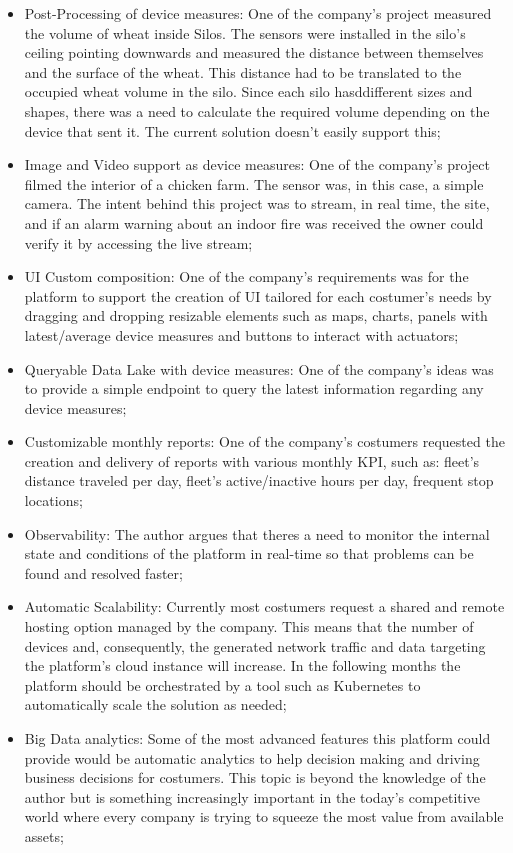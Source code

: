 \begin{itemize}
    \item Post-Processing of device measures: One of the company's project measured the volume of wheat inside Silos. The sensors were installed in the silo's ceiling pointing downwards and measured the distance between themselves and the surface of the wheat. This distance had to be translated to the occupied wheat volume in the silo. Since each silo hasddifferent sizes and shapes, there was a need to calculate the required volume depending on the device that sent it. The current solution doesn't easily support this;
    \item Image and Video support as device measures: One of the company's project filmed the interior of a chicken farm. The sensor was, in this case, a simple camera. The intent behind this project was to stream, in real time, the site, and if an alarm warning about an indoor fire was received the owner could verify it by accessing the live stream;
    \item UI Custom composition: One of the company's requirements was for the platform to support the creation of \gls{UI} tailored for each costumer's needs by dragging and dropping resizable elements such as maps, charts, panels with latest/average device measures and buttons to interact with actuators;
    \item Queryable Data Lake with device measures: One of the company's ideas was to provide a simple endpoint to query the latest information regarding any device measures;
    \item Customizable monthly reports: One of the company's costumers requested the creation and delivery of reports with various monthly \gls{KPI}, such as: fleet's distance traveled per day, fleet's active/inactive hours per day, frequent stop locations;
    \item Observability: The author argues that theres a need to monitor the internal state and conditions of the platform in real-time so that problems can be found and resolved faster;
    \item Automatic Scalability: Currently most costumers request a shared and remote hosting option managed by the company. This means that the number of devices and, consequently, the generated network traffic and data targeting the platform's cloud instance will increase. In the following months the platform should be orchestrated by a tool such as Kubernetes to automatically scale the solution as needed;
    \item Big Data analytics: Some of the most advanced features this platform could provide would be automatic analytics to help decision making and driving business decisions for costumers. This topic is beyond the knowledge of the author but is something increasingly important in the today's competitive world where every company is trying to squeeze the most value from available assets;

\end{itemize}

